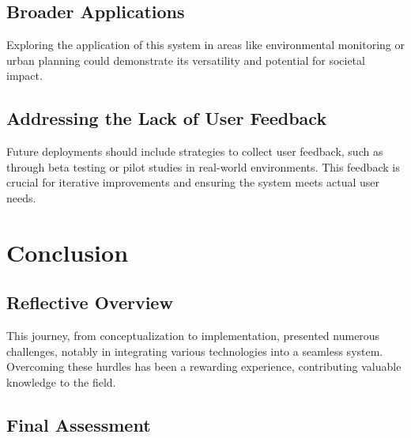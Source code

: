 \subsection{Broader Applications}

Exploring the application of this system in areas like environmental monitoring or urban planning could demonstrate its versatility and potential for societal impact.

\subsection{Addressing the Lack of User Feedback}

Future deployments should include strategies to collect user feedback, such as through beta testing or pilot studies in real-world environments. This feedback is crucial for iterative improvements and ensuring the system meets actual user needs.

\section{Conclusion}

\subsection{Reflective Overview}

This journey, from conceptualization to implementation, presented numerous challenges, notably in integrating various technologies into a seamless system. Overcoming these hurdles has been a rewarding experience, contributing valuable knowledge to the field.

\subsection{Final Assessment}

